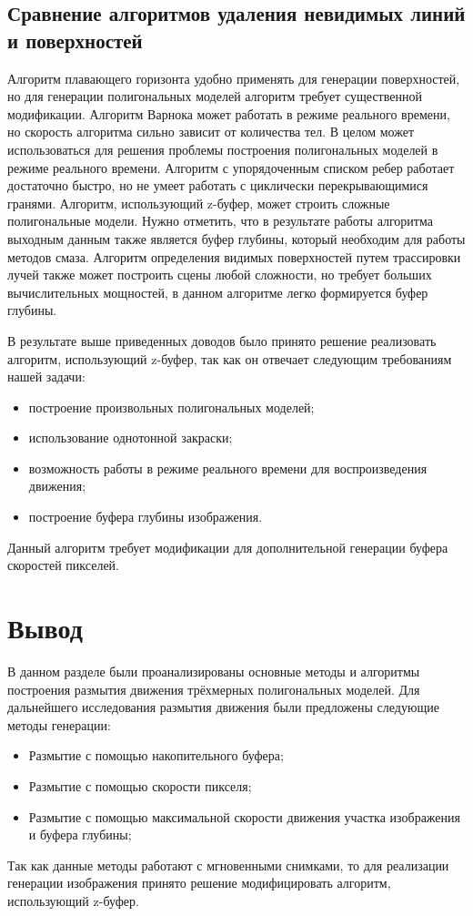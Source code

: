 \subsection{Сравнение алгоритмов удаления невидимых линий и поверхностей}

Алгоритм плавающего горизонта удобно применять для генерации поверхностей, но для генерации полигональных моделей алгоритм требует существенной модификации.
Алгоритм Варнока может работать в режиме реального времени, но скорость алгоритма сильно зависит от количества тел. В целом может использоваться для решения проблемы построения полигональных моделей в режиме реального времени.
Алгоритм с упорядоченным списком ребер работает достаточно быстро, но не умеет работать с циклически перекрывающимися гранями.
Алгоритм, использующий z-буфер, может строить сложные полигональные модели. Нужно отметить, что в результате работы алгоритма выходным данным также является буфер глубины, который необходим для работы методов смаза.
Алгоритм определения видимых поверхностей путем трассировки лучей также может построить сцены любой сложности, но требует больших вычислительных мощностей, в данном алгоритме легко формируется буфер глубины.
\par
В результате выше приведенных доводов было принято решение реализовать алгоритм, использующий z-буфер, так как он отвечает следующим  требованиям нашей задачи:
\begin{itemize}
    \item построение произвольных полигональных моделей;
    \item использование однотонной закраски;
    \item возможность работы в режиме реального времени для воспроизведения движения;
    \item построение буфера глубины изображения.
\end{itemize}


Данный алгоритм требует модификации для дополнительной генерации буфера скоростей пикселей.


\section{Вывод}

В данном разделе были проанализированы основные методы и алгоритмы построения размытия движения  трёхмерных полигональных моделей. Для дальнейшего исследования размытия движения были предложены следующие методы генерации:
\begin{itemize}
    \item Размытие с помощью накопительного буфера; 
    \item Размытие с помощью скорости пикселя; 
    \item Размытие с помощью максимальной скорости движения участка изображения и буфера глубины; 
\end{itemize}
\par
Так как данные методы работают с мгновенными снимками, то для реализации генерации изображения принято решение модифицировать алгоритм, использующий z-буфер. 

